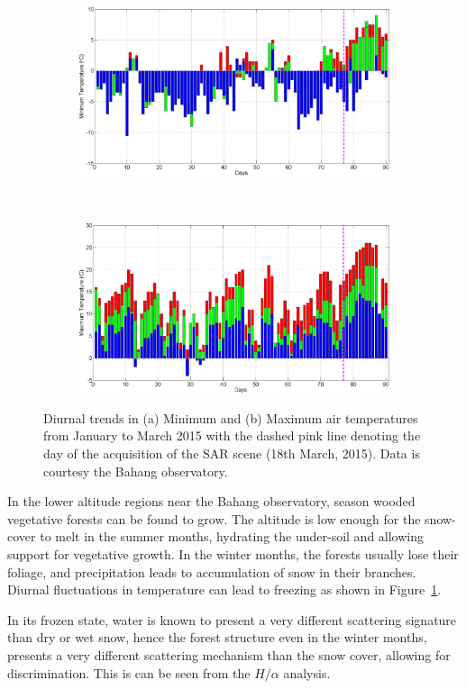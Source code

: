 \begin{figure}[htp]
\begin{subfigure}[b]{0.9\columnwidth}
\centering
\includegraphics[width=0.7\columnwidth]{Figures/SnowCover2018/Oldfig/Minimum_Temperature_Vs_Days}
\caption{}
\end{subfigure}
~
\begin{subfigure}[b]{0.9\columnwidth}
\centering
\includegraphics[width=0.7\columnwidth]{Figures/SnowCover2018/Oldfig/Maximum_Temperature_Vs_Days}
\caption{}
\end{subfigure}
\caption{Diurnal trends in (a) Minimum and (b) Maximum air temperatures from January to March 2015 with the dashed pink line denoting the day of the acquisition of the SAR scene (18th March, 2015). Data is courtesy the Bahang observatory.}
\label{fig:Diurnal}
\end{figure}

In the lower altitude regions near the Bahang observatory, season wooded vegetative forests can be found to grow.
%
The altitude is low enough for the snow-cover to melt in the summer months, hydrating the under-soil and allowing support for vegetative growth. In the winter months, the forests usually lose their foliage, and precipitation leads to accumulation of snow in their branches. Diurnal fluctuations in temperature can lead to freezing as shown in Figure~\ref{fig:Diurnal}. 

In its frozen state, water is known to present a very different scattering signature than dry or wet snow, hence the forest structure even in the winter months, presents a very different scattering mechanism than the snow cover, allowing for discrimination. This is can be seen from the $H/\alpha$ analysis. 

